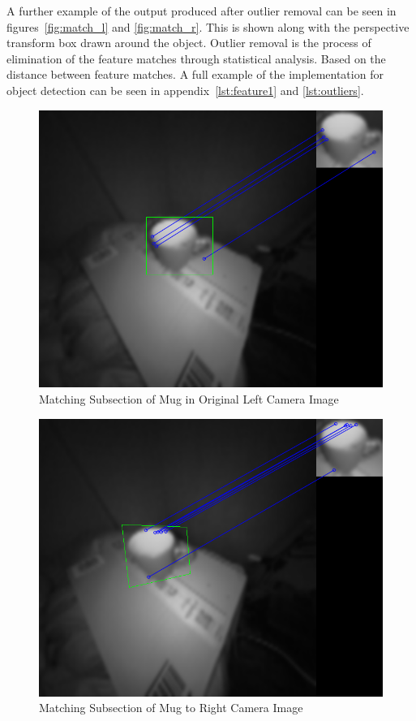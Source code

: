 \documentclass[11pt,oneside]{report}
\begin{document}
			A further example of the output produced after outlier removal can be seen in figures~\ref{fig:match_l} and \ref{fig:match_r}.
			This is shown along with the perspective transform box drawn around the object.
			Outlier removal is the process of elimination of the feature matches through statistical analysis.
			Based on the distance between feature matches.
			A full example of the implementation for object detection can be seen in appendix~\ref{lst:feature1} and \ref{lst:outliers}.
			\begin{figure}
			\centering
    				\includegraphics[width=\textwidth]{match_l}
    			\caption{Matching Subsection of Mug in Original Left Camera Image \protect {\label{fig:match_l}}}

			\end{figure}	
			\begin{figure}
			\centering
    				\includegraphics[width=\textwidth]{match_r}
    			\caption{Matching Subsection of Mug to Right Camera Image \protect {\label{fig:match_r}}}
			\end{figure}	
			\clearpage
\end{document}

